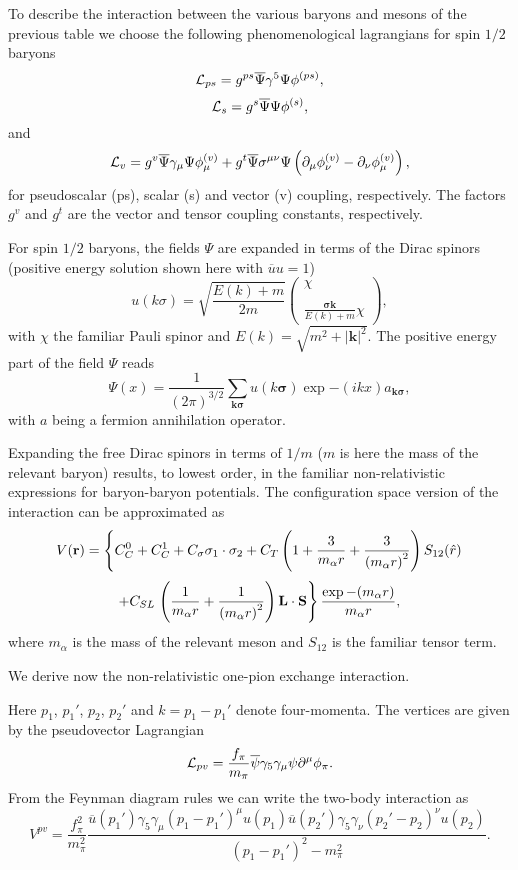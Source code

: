 \documentclass[graybox,sectrefs,envcountresetchap,open=right]{svmonodo}
\begin{document}
To describe the interaction between the various baryons and mesons of the previous
table we choose the following phenomenological
lagrangians
for spin $1/2$ baryons
\[
   {\cal L}_{ps} =g^{ps}\overline{\Psi}\gamma^{5}
   \Psi\phi^{(ps)},
\]
\[
   {\cal L}_{s} =g^{s}\overline{\Psi}\Psi\phi^{(s)},
\]
and
\[
   {\cal L}_{v} =g^{v}\overline{\Psi}\gamma_{\mu}\Psi\phi_{\mu}^{(v)}
   +g^{t}\overline{\Psi}\sigma^{\mu\nu}\Psi\left
   (\partial_{\mu}\phi_{\nu}^{(v)}
   -\partial_{\nu}\phi_{\mu}^{(v)}\right),
\]
for pseudoscalar (ps), scalar (s) and vector (v) coupling, respectively.
The factors $g^{v}$ and $g^{t}$ are the vector
and tensor coupling constants, respectively.

For spin $1/2$ baryons, the fields $\Psi$ are expanded
in terms of the Dirac spinors (positive energy
solution shown here with $\overline{u}u=1$)
\[
   u(k\sigma)=\sqrt{\frac{E(k)+m}{2m}}
	  \left(\begin{array}{c} \chi\\ \\
	  \frac{\mathbf{\sigma}\mathbf{k}}{E(k)+m}\chi
	  \end{array}\right), 
\]
with $\chi$ the familiar Pauli spinor and $E(k) =\sqrt{m^2 +|\mathbf{k}|^2}$. 
The positive energy part of the field $\Psi$ reads
\[
\Psi (x)={\displaystyle \frac{1}{(2\pi )^{3/2}}
        \sum_{\mathbf{k}\mathbf{\sigma}}u(k\mathbf{\sigma})\exp{-(ikx)}a_{\mathbf{k}\mathbf{\sigma}}},
\]
with $a$ being a fermion annihilation operator.

Expanding the free Dirac spinors
in terms of $1/m$ ($m$ is here the mass of the relevant baryon) 
results, to lowest order, in the familiar non-relativistic
expressions for baryon-baryon potentials.
The configuration space version of the interaction can be approximated as
\[
V(\mathbf{r})= \left\{ C^0_C + C^1_C + C_\sigma 
\mathbf{\sigma}_1\cdot\mathbf{\sigma}_2
 + C_T \left( 1 + {3\over m_\alpha r} + {3\over
\left(m_\alpha r\right)^2}
\right) S_{12} (\hat r)\right.
\]
\[
+ C_{SL}\left. \left( {1\over m_\alpha r} + {1\over \left( m_\alpha r\right)^2}
\right) \mathbf{L}\cdot \mathbf{S}
\right\} \frac{\exp{-(m_\alpha r)}}{m_\alpha r},
\]
where $m_{\alpha}$ is the mass of the relevant meson and
$S_{12}$ is the familiar tensor term.


We derive now the non-relativistic one-pion exchange interaction.

Here $p_{1}$, $p_{1}'$, $p_{2}$, $p_{2}'$ and $k=p_{1}-p_{1}'$ denote 
four-momenta.  
The vertices are 
given by the pseudovector Lagrangian
\[
{\cal L}_{pv}=\frac{f_{\pi}}{m_{\pi}}\overline{\psi}\gamma_{5}\gamma_{\mu}
\psi\partial^{\mu}\phi_{\pi}.
\]
 From the Feynman diagram rules we can write the two-body interaction as  
\[
V^{pv}=\frac{f_{\pi}^{2}}{m_{\pi}^{2}}\frac{\overline{u}(p_{1}')\gamma_{5}
\gamma_{\mu}(p_{1}-p_{1}')^{\mu}u(p_{1})\overline{u}(p_{2}')\gamma_{5}
\gamma_{\nu}(p_{2}'-p_{2})^{\nu}u(p_{2})}{(p_{1}-p_{1}')^{2}-m_{\pi}^{2}}.
\]
\end{document}
